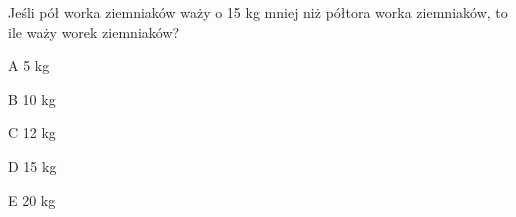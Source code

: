 \begin{tresc}
Jeśli pół worka ziemniaków waży o 15 kg mniej niż półtora worka ziemniaków, to ile waży worek ziemniaków?
\end{tresc}
\begin{wariant}{A} 5 kg \end{wariant}
\begin{wariant}{B} 10 kg \end{wariant}
\begin{wariant}{C} 12 kg \end{wariant}
\begin{wariant}{D} 15 kg \end{wariant}
\begin{wariant}{E} 20 kg \end{wariant}
